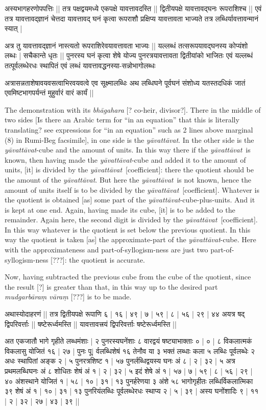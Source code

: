 \documentclass[12pt]{book}
\let\*=\d
\def\ya{\textit{y\=avat\-t\=avat}}
\begin{document}
{\s अस्यभागहरणोपपत्तिः ||
तत्र पक्षद्वयमध्ये एकपक्षे यावत्तावदस्ति ||
द्वितीयपक्षे यावत्तावद्घनः रूपराशिश्च ||
एवं तत्र यावत्तावद्ज्ञानं चेत्तदा यावत्तावद् घनं कृत्वा
रूपराशौ प्रक्षिप्य यावत्तावता भाज्यते तत्र लब्धिर्यावत्तावन्मानं स्यात् |

अत्र तु यावत्तावद्ज्ञानं नास्त्यतो रूपराशिरेवयावत्तावता भाज्यः ||
यल्लब्धं तत्सरूपयावद्घनस्य कोप्यंशो लब्धः |
सचैकान्ते धृतः || पुनरस्य घनं कृत्वा शेषे
योज्य पुनरत्रयावत्तावता द्वितीयांको भाजितः एवं यल्लब्धं तत्पूर्वलब्धेरधः स्थापितं एवं लब्धं यावत्तावद्धनस्या-सन्नोभागोलब्धः

अत्रासन्नताशेषावयवसत्वाभिरवयवत्वे एव सूक्ष्मालब्धिः अथ लब्धिघने पूर्वघनं
संशोध्य यतस्तदधिकं जातं एवमिष्टभागपर्यन्तं मुहुर्वारं वारं कार्यं ||}

\newpage

The demonstration with its \textit{bh\=agahara} [? co-heir, divisor?]. There in 
the middle of two sides [Is there an Arabic term for ``in an equation'' that this
is literally translating?  see expressions for ``in an equation'' such as 2 lines
above marginal (8) in Rumi-Beg facsimile], in one side is the \ya. 
In the other side is the \ya-cube
and the amount of units. In this way there if the \ya\ is known, then having
made the \ya-cube and added it to the amount of units, [it] is divided by 
the \ya\ [coefficient]:  there the quotient should be the amount of the \ya. But here the
\ya\ is not known, hence the amount of units itself is to be divided by the \ya\
[coefficient]. 
Whatever is the quotient is obtained [as] some part of the \ya-cube-plus-units.
And it is kept at one end. Again, having made its cube, [it] is to be added
to the remainder. Again here, the second digit is divided by the \ya\ [coefficient]. In this way
whatever is the quotient is set below the previous quotient. In this way
the quotient is taken [as] the approximate-part of the \ya-cube. Here with the 
approximateness and part-of-syllogism-ness are just two part-of-syllogism-ness [???]:
the quotient is accurate. 

Now, having subtracted the previous cube from the cube of the quotient, since
the result [?] is greater than that, in this way up to the desired part 
\textit{mudgarb\=ara\*m v\=ara\*m} [???] is to be made.

\newpage

{\s अथास्योदाहरणं ||
तत्र द्वितीयपक्षे रूपाणि ६ | १६ | ४९ | ७ | ५९ | ८ | ५६ | २९ | ४४ अयत्र षद्
द्विपरिवर्त्ताः ||
षष्टेरूर्ध्वमस्ति ||
यावत्तावत्त्रयं द्विपरिवर्त्ताः षष्टेरूर्ध्वमस्ति ||

अत एकजातौ भागे गृहीते लब्धमंशाः | २ पुनरस्यघनेंशाः ८ वारद्वयं षष्ट्याभाक्ताः ० |
० | ८ विकलात्मकं विकलासु योजितं १६ | २७ | पुनः पू$|$\marginnote{f.~4v J}%
र्वलब्धिशेषं १६
तेनौव या ३ भक्तं लब्धाः कला ५ लब्धिः पूर्वलब्धेः २ अधः स्थापितां अङ्क २ | ५
पुनरत्रशिष्ट १ | ५७ पुनर्लब्धिद्वयस्य घनः अं ८ | २ | ३२ | ५
अत्र प्रथमलब्धिघनः अं ८
शोधितः शेषं अं १ | २ | ३२ | ५ इदं शेषे अं १ | ५७ | ७ | ५९ | ८ | ५६ | २९ | ४० अंशस्थाने योजितं
१ | ५८ | १० | ३१ | १३ पुनर्हरेणया ३ अंशे ५८ भागोगृहीतः लब्धिर्विकलात्मिका ३९ शेषं अं १ | १० | ३१ | १३ पुनरियंलब्धिः पूर्वलब्धेरधः स्थाप्य २ | ५ |
३९ | अस्य घनोंशादिः ९ | ११ | २ | ३२ | २७ | ४३ | ३९ || }
\end{document}

